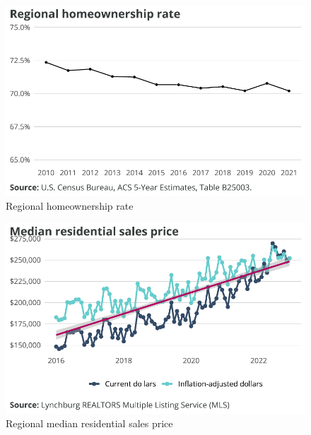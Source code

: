 \documentclass[
  letterpaper,
  DIV=11,
  numbers=noendperiod]{scrreprt}
\begin{document}
\begin{figure}[H]

{\centering \includegraphics{./part-3-1_files/figure-pdf/fig-ho-rate-1.pdf}

}

\caption{\label{fig-ho-rate}Regional homeownership rate}

\end{figure}

\begin{figure}[H]

{\centering \includegraphics{./part-3-1_files/figure-pdf/fig-mls-price-1.pdf}

}

\caption{\label{fig-mls-price}Regional median residential sales price}

\end{figure}
\end{document}
